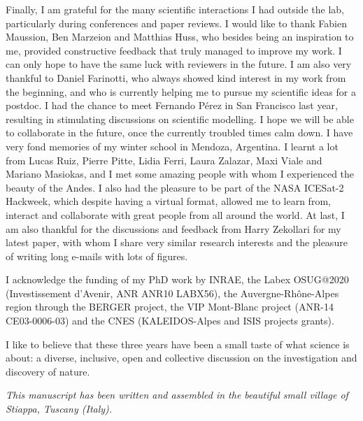 Finally, I am grateful for the many scientific interactions I had outside the lab, particularly during conferences and paper reviews. I would like to thank Fabien Maussion, Ben Marzeion and Matthias Huss, who besides being an inspiration to me, provided constructive feedback that truly managed to improve my work. I can only hope to have the same luck with reviewers in the future. I am also very thankful to Daniel Farinotti, who always showed kind interest in my work from the beginning, and who is currently helping me to pursue my scientific ideas for a postdoc. I had the chance to meet Fernando Pérez in San Francisco last year, resulting in stimulating discussions on scientific modelling. I hope we will be able to collaborate in the future, once the currently troubled times calm down. I have very fond memories of my winter school in Mendoza, Argentina. I learnt a lot from Lucas Ruiz, Pierre Pitte, Lidia Ferri, Laura Zalazar, Maxi Viale and Mariano Masiokas, and I met some amazing people with whom I experienced the beauty of the Andes. I also had the pleasure to be part of the NASA ICESat-2 Hackweek, which despite having a virtual format, allowed me to learn from, interact and collaborate with great people from all around the world. At last, I am also thankful for the discussions and feedback from Harry Zekollari for my latest paper, with whom I share very similar research interests and the pleasure of writing long e-mails with lots of figures.

I acknowledge the funding of my PhD work by INRAE, the Labex OSUG@2020 (Investissement d'Avenir, ANR ANR10 LABX56), the Auvergne-Rhône-Alpes region through the BERGER project, the VIP Mont-Blanc project (ANR-14 CE03-0006-03) and the CNES (KALEIDOS-Alpes and ISIS projects grants).

I like to believe that these three years have been a small taste of what science is about: a diverse, inclusive, open and collective discussion on the investigation and discovery of nature. 

\bigskip
\bigskip
\bigskip
\bigskip

\begin{flushright}
\begin{small}
\textit{This manuscript has been written and assembled in the beautiful small village of Stiappa, Tuscany (Italy).}
\end{small}
\end{flushright}
